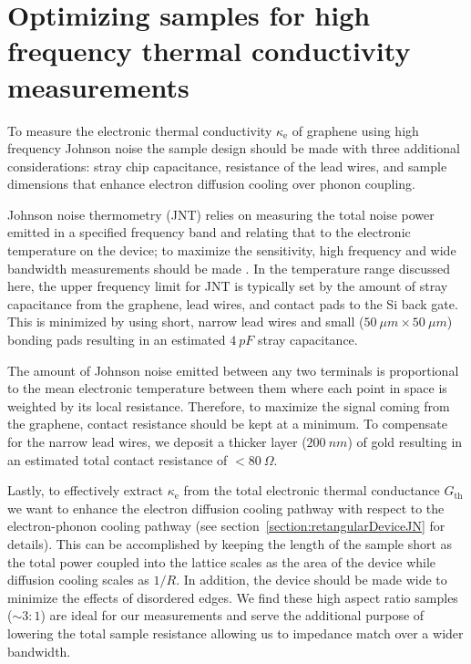 \section{Optimizing samples for high frequency thermal conductivity measurements}
To measure the electronic thermal conductivity $\kappa_{\mathrm{e}}$ of graphene using high frequency Johnson noise the sample design should be made with three additional considerations: stray chip capacitance, resistance of the lead wires, and sample dimensions that enhance electron diffusion cooling over phonon coupling. 

Johnson noise thermometry (JNT) relies on measuring the total noise power emitted in a specified frequency band and relating that to the electronic temperature on the device; to maximize the sensitivity, high frequency and wide bandwidth measurements should be made \cite{crossno_development_2015}. In the temperature range discussed here, the upper frequency limit for JNT is typically set by the amount of stray capacitance from the graphene, lead wires, and contact pads to the Si back gate. This is minimized by using short, narrow lead wires and small ($50~\mu m\times50~\mu m$) bonding pads resulting in an estimated $4~pF$ stray capacitance. 

The amount of Johnson noise emitted between any two terminals is proportional to the mean electronic temperature between them where each point in space is weighted by its local resistance. Therefore, to maximize the signal coming from the graphene, contact resistance should be kept at a minimum. To compensate for the narrow lead wires, we deposit a thicker layer ($200~nm$) of gold resulting in an estimated total contact resistance of $<80~\Omega$.

Lastly, to effectively extract $\kappa_{\mathrm{e}}$ from the total electronic thermal conductance $G_{\mathrm{th}}$ we want to enhance the electron diffusion cooling pathway with respect to the electron-phonon cooling pathway (see section~\ref{section:retangularDeviceJN} for details). This can be accomplished by keeping the length of the sample short as the total power coupled into the lattice scales as the area of the device while diffusion cooling scales as $1/R$. In addition, the device should be made wide to minimize the effects of disordered edges. We find these high aspect ratio samples ($\sim 3:1$) are ideal for our measurements and serve the additional purpose of lowering the total sample resistance allowing us to impedance match over a wider bandwidth.

